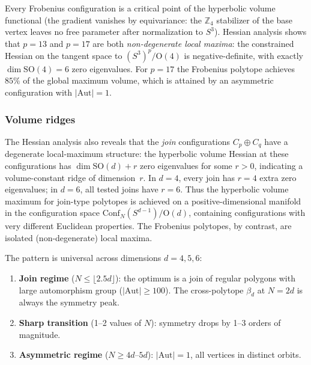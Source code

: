 \documentclass[11pt]{article}
\begin{document}
Every Frobenius configuration is a critical point of the hyperbolic volume
functional (the gradient vanishes by equivariance: the $\mathbb{Z}_4$ stabilizer
of the base vertex leaves no free parameter after normalization to $S^3$).
Hessian analysis shows that $p = 13$ and $p = 17$ are both
\emph{non-degenerate local maxima}: the constrained Hessian on
the tangent space to $(S^3)^p / \mathrm{O}(4)$ is negative-definite,
with exactly $\dim \mathrm{SO}(4) = 6$ zero eigenvalues.  For $p = 17$
the Frobenius polytope achieves $85\%$ of the global maximum volume,
which is attained by an asymmetric configuration with $|\mathrm{Aut}| = 1$.

\subsubsection{Volume ridges}

The Hessian analysis also reveals that the \emph{join} configurations
$C_p \oplus C_q$ have a degenerate local-maximum structure: the
hyperbolic volume Hessian at these configurations has
$\dim \mathrm{SO}(d) + r$ zero eigenvalues for some $r > 0$,
indicating a volume-constant ridge of dimension~$r$.  In $d = 4$,
every join has $r = 4$ extra zero eigenvalues; in $d = 6$, all
tested joins have $r = 6$.  Thus the hyperbolic volume maximum for
join-type polytopes is achieved on a positive-dimensional manifold
in the configuration space $\mathrm{Conf}_N(S^{d-1}) / \mathrm{O}(d)$,
containing configurations with very different Euclidean properties.
The Frobenius polytopes, by contrast, are isolated (non-degenerate)
local maxima.

The pattern is universal across dimensions $d = 4, 5, 6$:
\begin{enumerate}[label=(\roman*)]
\item \textbf{Join regime} ($N \leq \lfloor 2.5 d \rfloor$):
      the optimum is a join of regular polygons with large
      automorphism group ($|\mathrm{Aut}| \geq 100$).
      The cross-polytope $\beta_d$ at $N = 2d$ is always the
      symmetry peak.
\item \textbf{Sharp transition} (1--2 values of $N$):
      symmetry drops by 1--3 orders of magnitude.
\item \textbf{Asymmetric regime} ($N \geq 4d$--$5d$):
      $|\mathrm{Aut}| = 1$, all vertices in distinct orbits.
\end{enumerate}
\end{document}
